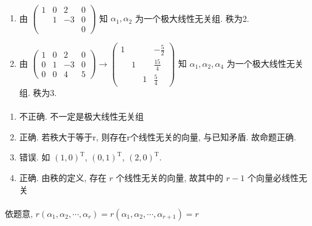 	 \paragraph{} %
		 \begin{enumerate}
			 \item %
			       由 \(
			       \begin{pmatrix}
				       1 & 0 & 2  & 0 \\
				         & 1 & -3 & 0 \\
				         &   &    & 0\end{pmatrix} \) 知 \( \alpha_{1}, \alpha_{2} \) 为一个极大线性无关组. 秩为2.
			 \item %
			       由 \(
			       \begin{pmatrix}
				       1 & 0 & 2  & 0 \\
				       0 & 1 & -3 & 0 \\
				       0 & 0 & 4  & 5\end{pmatrix} \to
			       \begin{pmatrix}
				       1 &   &   & -\frac{5}{2} \\
				         & 1 &   & \frac{15}{4} \\
				         &   & 1 & \frac{5}{4}\end{pmatrix} \) 知 \( \alpha_{1}, \alpha_{2}, \alpha_{4} \) 为一个极大线性无关组. 秩为3.
		 \end{enumerate}

	 \paragraph{} %
		 \begin{enumerate}
			 \item %
			       不正确. 不一定是极大线性无关组
			 \item %
			       正确. 若秩大于等于r, 则存在r个线性无关的向量, 与已知矛盾. 故命题正确.
			 \item %
			       错误. 如 \( (1, 0)^{\mathrm{T}} \), \( (0, 1)^{\mathrm{T}} \), \( (2, 0)^{\mathrm{T}} \).
			 \item %
			       正确. 由秩的定义, 存在 \(r\) 个线性无关的向量, 故其中的 \(r-1\) 个向量必线性无关
		 \end{enumerate}

	 \paragraph{} %
		 依题意, \( r(\alpha_{1}, \alpha_{2}, \cdots, \alpha_{r}) = r(\alpha_{1}, \alpha_{2}, \cdots, \alpha_{r+1}) = r \)

